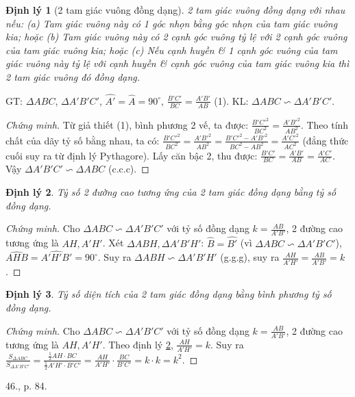 \documentclass{article}
\newtheorem{dinhly}{Định lý}
\begin{document}
\begin{dinhly}[2 tam giác vuông đồng dạng]
	2 tam giác vuông đồng dạng với nhau nếu: (a) Tam giác vuông này có 1 góc nhọn bằng góc nhọn của tam giác vuông kia; hoặc (b) Tam giác vuông này có 2 cạnh góc vuông tỷ lệ với 2 cạnh góc vuông của tam giác vuông kia; hoặc (c) Nếu cạnh huyền \& 1 cạnh góc vuông của tam giác vuông này tỷ lệ với cạnh huyền \& cạnh góc vuông của tam giác vuông kia thì 2 tam giác vuông đó đồng dạng.
\end{dinhly}
GT: $\Delta ABC$, $\Delta A'B'C'$, $\widehat{A'} = \widehat{A} = 90^\circ$, $\frac{B'C'}{BC} = \frac{A'B'}{AB}$ (1). KL: $\Delta ABC\backsim\Delta A'B'C'$.

\begin{proof}[Chứng minh]
	Từ giả thiết (1), bình phương 2 vế, ta được: $\frac{B'C'^2}{BC^2} = \frac{A'B'^2}{AB^2}$. Theo tính chất của dãy tỷ số bằng nhau, ta có: $\frac{B'C'^2}{BC^2} = \frac{A'B'^2}{AB^2} = \frac{B'C'^2 - A'B'^2}{BC^2 - AB^2} = \frac{A'C'^2}{AC^2}$ (đẳng thức cuối suy ra từ định lý Pythagore). Lấy căn bậc 2, thu được: $\frac{B'C'}{BC} = \frac{A'B'}{AB} = \frac{A'C'}{AC}$. Vậy $\Delta A'B'C'\backsim\Delta ABC$ (c.c.c).
\end{proof}

\begin{dinhly}
	\label{thm: heights of similar triangles}
	Tỷ số 2 đường cao tương ứng của 2 tam giác đồng dạng bằng tỷ số đồng dạng.
\end{dinhly}

\begin{proof}[Chứng minh]
	Cho $\Delta ABC\backsim\Delta A'B'C'$ với tỷ số đồng dạng $k = \frac{AB}{A'B'}$, 2 đường cao tương ứng là $AH,A'H'$. Xét $\Delta ABH,\Delta A'B'H'$: $\widehat{B} = \widehat{B'}$ (vì $\Delta ABC\backsim\Delta A'B'C'$), $\widehat{AHB} = \widehat{A'H'B'} = 90^\circ$. Suy ra $\Delta ABH\backsim\Delta A'B'H'$ (g.g.g), suy ra $\frac{AH}{A'H'} = \frac{AB}{A'B'} = k$.
\end{proof}

\begin{dinhly}
	Tỷ số diện tích của 2 tam giác đồng dạng bằng bình phương tỷ số đồng dạng.
\end{dinhly}

\begin{proof}[Chứng minh]
	Cho $\Delta ABC\backsim\Delta A'B'C'$ với tỷ số đồng dạng $k = \frac{AB}{A'B'}$, 2 đường cao tương ứng là $AH,A'H'$. Theo định lý \ref{thm: heights of similar triangles}, $\frac{AH}{A'H'} = k$. Suy ra $\frac{S_{\Delta ABC}}{S_{\Delta A'B'C'}} = \frac{\frac{1}{2}AH\cdot BC}{\frac{1}{2}A'H'\cdot B'C'} = \frac{AH}{A'H'}\cdot\frac{BC}{B'C'} = k\cdot k = k^2$.
\end{proof}
46., p. 84.
\end{document}
